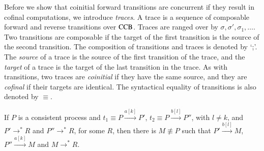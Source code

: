 \noindent
Before we show that coinitial forward transitions are concurrent if they result in cofinal computations,
we introduce \emph{traces}. A trace is a sequence of composable forward and reverse transitions
over ${\rm CCB}$. Traces are ranged over by $\sigma, \sigma', \sigma_1, \ldots$.
Two transitions are composable if the target of the first transition is the source of the second
transition. The composition of transitions and traces is denoted by `;'. 
The \emph{source} of a trace is the source
of the first transition of the trace, and the \emph{target} of a trace is the target of the last transition
in the trace. As with transitions, 
two traces are \emph{coinitial} if they have the same source, and they are \emph{cofinal}
if their targets are identical. The syntactical equality of transitions is also denoted by $\equiv$. 

%
\begin{proposition}\label{prop:forwarddiamond}
If $P$ is a consistent process and $t_1 \equiv P \xrightarrow{a[k]} P'$, 
$t_2 \equiv P \xrightarrow{b[l]} P''$,  with $l \neq k $,
and $P' \rightarrow^*R$ and $P'' \rightarrow^* R$, for some $R$, then there is $M\not\equiv P$ such
that $P' \xrightarrow{b[l]} M$, $P'' \xrightarrow{a[k]} M$ and $M \rightarrow^* R$.
\end{proposition}

